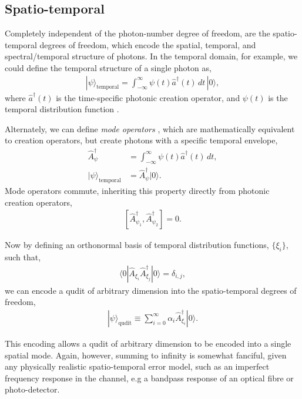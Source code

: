 \documentclass[aps,rmp,twocolumn,amsmath,amssymb,nofootinbib,superscriptaddress,longbibliography,floatfix,table-of-contents,eqsecnum]{revtex4-1}
\newcommand{\bra}[1]{\langle#1|}
\newcommand{\ket}[1]{|#1\rangle}
\begin{document}
%
%

\subsection{Spatio-temporal} \label{sec:spatio_temporal} 

Completely independent of the photon-number degree of freedom, are the spatio-temporal degrees of freedom, which encode the spatial, temporal, and spectral/temporal structure of photons. In the temporal domain, for example, we could define the temporal structure of a single photon as,
\begin{align}
\ket\psi_\text{temporal} = \int_{-\infty}^\infty \psi(t) \hat{a}^\dag(t)\,dt\,\ket{0},
\end{align}
where $\hat{a}^\dag(t)$ is the time-specific photonic creation operator, and $\psi(t)$ is the temporal distribution function \cite{bib:RohdeFreqTemp05}.

Alternately, we can define \textit{mode operators} \cite{bib:RohdeMauererSilberhorn07}, which are mathematically equivalent to creation operators, but create photons with a specific temporal envelope,
\begin{align}
\hat{A}^\dag_\psi &= \int_{-\infty}^\infty \psi(t) \hat{a}^\dag(t)\,dt, \nonumber \\
\ket\psi_\text{temporal} &= \hat{A}^\dag_\psi \ket{0}.
\end{align}
Mode operators commute, inheriting this property directly from photonic creation operators,
\begin{align}
\left[\hat{A}^\dag_{\psi_1},\hat{A}^\dag_{\psi_2}\right]=0.
\end{align}

Now by defining an orthonormal basis of temporal distribution functions, $\{\xi_i\}$, such that,
\begin{align} \label{eq:spec_orth_def}
\bra{0} \hat{A}_{\xi_i} \hat{A}^\dag_{\xi_j}\ket{0} = \delta_{i,j},
\end{align}
we can encode a qudit of arbitrary dimension into the spatio-temporal degrees of freedom,
\begin{align}
\ket\psi_\text{qudit} \equiv \sum_{i=0}^\infty \alpha_i \hat{A}^\dag_{\xi_i} \ket{0}.
\end{align}

This encoding allows a qudit of arbitrary dimension to be encoded into a single spatial mode. Again, however, summing to infinity is somewhat fanciful, given any physically realistic spatio-temporal error model, such as an imperfect frequency response in the channel, e.g a bandpass response of an optical fibre or photo-detector.
\end{document}
